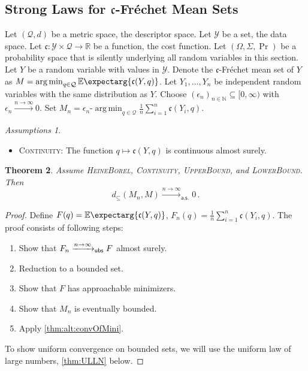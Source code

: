 \documentclass{scrartcl}
\renewcommand{\subset}{\subseteq}
\newcommand{\Ex}{\E\expectarg}
\newcommand*{\mc}[1]{\mathcal{#1}}
\newcommand*{\ms}[1]{\mathsf{#1}}
\newcommand*{\mf}[1]{\mathfrak{#1}}
\newcommand{\N}{\mathbb{N}}
\newcommand{\R}{\mathbb{R}}
\newcommand{\equationFullstop}{\, .}
\newcommand{\eqfs}{\equationFullstop}
\DeclareMathOperator*{\argmin}{arg\,min}
\theoremstyle{plain}\newtheorem{theorem}{Theorem}[section]
\theoremstyle{definition}
\theoremstyle{remark}
\newtheorem{assumptions}[theorem]{Assumptions}
\providecommand{\DIFaddtex}[1]{{\protect\color{blue}\uwave{#1}}} %
\providecommand{\DIFaddbegin}{} %
\providecommand{\DIFaddend}{} %
\providecommand{\DIFadd}[1]{\texorpdfstring{\DIFaddtex{#1}}{#1}} %
\newcommand{\DIFaddincludegraphics}[2][]{{\color{blue}\fbox{\DIFOincludegraphics[#1]{#2}}}} %
\DeclareRobustCommand{\DIFaddbegin}{\DIFOaddbegin \let\includegraphics\DIFaddincludegraphics} %
\DeclareRobustCommand{\DIFaddend}{\DIFOaddend \let\includegraphics\DIFOincludegraphics} %
\begin{document}
\begin{appendix}
\subsection{Strong Laws for $\mf c$-Fréchet Mean Sets}\label{ssec:alt:gen}
Let $(\mc Q, d)$ be a metric space, the descriptor space. Let $\mc Y$ be a set, the data space. Let $\mf c\colon \mc Y \times\mc Q \to \R$ be a function, the cost function. Let $(\Omega, \Sigma, \Pr)$ be a probability space that is silently underlying all random variables in this section. Let $Y$ be a random variable with values in $\mc Y$. Denote the $\mf c$-Fréchet mean set of $Y$ as $M = \argmin_{q\in\mc Q} \Ex{\mf c(Y, q)}$.
Let $Y_1, \dots, Y_n$ be independent random variables with the same distribution as $Y$.
Choose $(\epsilon_n)_{n\in\N}\subset [0,\infty)$ with $\epsilon_n \xrightarrow{n\to\infty}0$. Set $M_n = \epsilon_n\text{-}\argmin_{q\in\mc Q} \frac{1}n \sum_{i=1}^n \mf c(Y_i, q)$.
\begin{assumptions}\mbox{ }
\begin{itemize}
	\item \textsc{Continuity}:  The function $q \mapsto \mf c(Y, q)$ is continuous almost surely.
	\end{itemize}
\end{assumptions}
\begin{theorem}\label{thm:alt:consistency}
	Assume \textsc{HeineBorel}, \textsc{Continuity}, \textsc{UpperBound}, and \textsc{LowerBound}. Then
	\begin{equation*}
		d_\subset(M_n, M) \xrightarrow{n\to\infty}_{\ms{a.s.}} 0
		\eqfs
	\end{equation*}
\end{theorem}
\begin{proof}
Define $F(q) = \Ex{\mf c(Y, q)}$, $F_n(q) = \frac{1}n\sum_{i=1}^n \mf c(Y_i, q)$.  The proof consists of \DIFaddbegin \DIFadd{the }\DIFaddend following steps:
\begin{enumerate}
\item Show that $F_n \xrightarrow{n\to\infty}_{\mathsf{ubs}} F$ almost surely.
\item Reduction to a bounded set.
\item Show that $F$ has approachable minimizers.
\item Show that $M_n$ is eventually bounded.
\item Apply \autoref{thm:alt:convOfMini}.
\end{enumerate}
\underline{}
To show uniform convergence on bounded sets, we will use the uniform law of large numbers, \autoref{thm:ULLN} below.

\end{proof}
\end{appendix}
\end{document}
